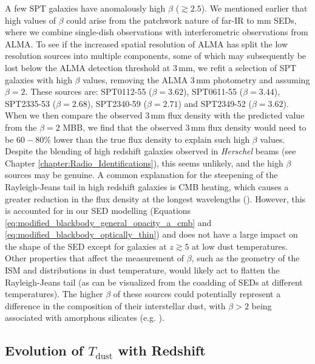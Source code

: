 A few SPT galaxies have anomalously high $\beta$ ($\gtrsim 2.5$). We mentioned earlier that high values of $\beta$ could arise from the patchwork nature of far-IR to mm SEDs, where we combine single-dish observations with interferometric observations from ALMA. To see if the increased spatial resolution of ALMA has split the low resolution sources into multiple components, some of which may subsequently be lost below the ALMA detection threshold at $3\,$mm, we refit a selection of SPT galaxies with high $\beta$ values, removing the ALMA $3\,$mm photometry and assuming $\beta = 2$. These sources are: SPT0112-55 ($\beta = 3.62$), SPT0611-55 ($\beta = 3.44$), SPT2335-53 ($\beta = 2.68$), SPT2340-59 ($\beta = 2.71$) and SPT2349-52 ($\beta = 3.62$). When we then compare the observed $3\,$mm flux density with the predicted value from the $\beta = 2$ MBB, we find that the observed $3\,$mm flux density would need to be $60 - 80\%$ lower than the true flux density to explain such high $\beta$ values. Despite the blending of high redshift galaxies observed in \textit{Herschel} beams (see Chapter \ref{chapter:Radio_Identifications}), this seems unlikely, and the high $\beta$ sources may be genuine. A common explanation for the steepening of the Rayleigh-Jeans tail in high redshift galaxies is CMB heating, which causes a greater reduction in the flux density at the longest wavelengths (\citealt{daCunha_2013}). However, this is accounted for in our SED modelling (Equations \ref{eq:modified_blackbody_general_opacity_a_cmb} and \ref{eq:modified_blackbody_optically_thin}) and does not have a large impact on the shape of the SED except for galaxies at $z \gtrsim 5$ at low dust temperatures. Other properties that affect the measurement of $\beta$, such as the geometry of the ISM and distributions in dust temperature, would likely act to flatten the Rayleigh-Jeans tail (as can be visualized from the coadding of SEDs at different temperatures). The higher $\beta$ of these sources could potentially represent a difference in the composition of their interstellar dust, with $\beta > 2$ being associated with amorphous silicates (e.g. \citealt{Draine_1984, Agladze_1996, Meny_2007}).

\subsection{Evolution of $T_{\textrm{dust}}$ with Redshift}
\label{sec:dust_temperature_evolution}

